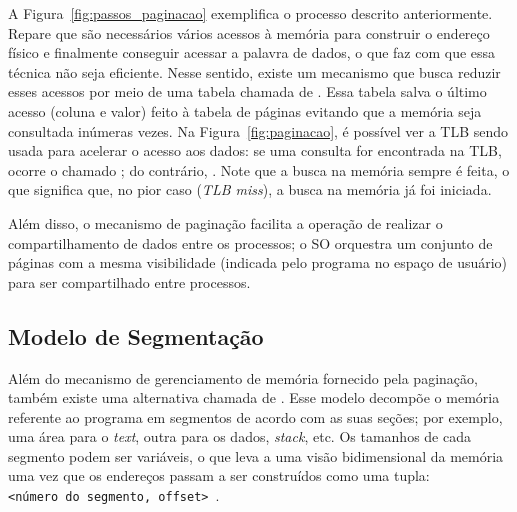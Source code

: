 A Figura~\ref{fig:passos_paginacao} exemplifica o processo descrito
anteriormente. Repare que são necessários vários acessos à memória para
construir o endereço físico e finalmente conseguir acessar a palavra de dados,
o que faz com que essa técnica não seja eficiente.
Nesse sentido, existe um mecanismo que busca reduzir esses acessos por meio de
uma tabela chamada de . Essa
tabela salva o último acesso (coluna e valor) feito à tabela de páginas
evitando que a memória seja consultada inúmeras vezes. Na
Figura~\ref{fig:paginacao}, é possível ver a TLB sendo usada para acelerar o
acesso aos dados: se uma consulta for encontrada na TLB, ocorre o chamado
; do contrário, . Note que a busca na memória sempre é feita, o que significa que,
no pior caso (\emph{TLB miss}), a busca na memória já foi iniciada.

 Além
disso, o mecanismo de paginação facilita a operação de realizar o
compartilhamento de dados entre os processos; o SO orquestra um conjunto de
páginas com a mesma visibilidade (indicada pelo programa no espaço de usuário)
para ser compartilhado entre processos.

\subsection{Modelo de Segmentação}

Além do mecanismo de gerenciamento de memória fornecido pela paginação, também
existe uma alternativa chamada de . Esse modelo
decompõe o memória referente ao programa em segmentos de acordo com as suas seções;
por exemplo, uma
área para o \textit{text}, outra para os dados, \textit{stack}, etc. Os
tamanhos de cada segmento podem ser variáveis, o que leva a uma visão
bidimensional da memória uma vez que os endereços passam a ser construídos como
uma tupla: \\

\texttt{<número do segmento, offset>}~\citep{silberschatz}.

